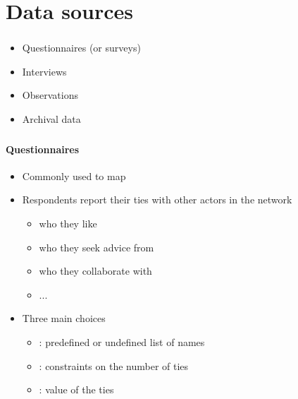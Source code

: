 \documentclass[8pt]{beamer}
\begin{document}


\section{Data sources}


\bgroup
{}
\begin{frame}[plain]{}
\begin{center}
\color{white}{\Huge\insertsection}
\end{center}
\end{frame}
\egroup



\begin{frame}
\frametitle{\insertsection}

\begin{itemize}
\item Questionnaires (or surveys)
\item Interviews
\item Observations
\item Archival data
\end{itemize}

\end{frame}


\begin{frame}
\frametitle{\insertsection}
\framesubtitle{Questionnaires}

\begin{itemize}
\item Commonly used to map {\color{blue}{relatively small social networks}}
\item Respondents report their ties with other actors in the network 
    \begin{itemize}
    \item who they like
    \item who they seek advice from
    \item who they collaborate with
    \item ...
    \end{itemize}  
\item Three main choices
    \begin{itemize}
    \item {\color{blue}{Choice 1}}: predefined or undefined list of names 
    \item {\color{blue}{Choice 2}}: constraints on the number of ties
    \item {\color{blue}{Choice 3}}: value of the ties
    \end{itemize}

\end{itemize}

\end{frame}
\end{document}

